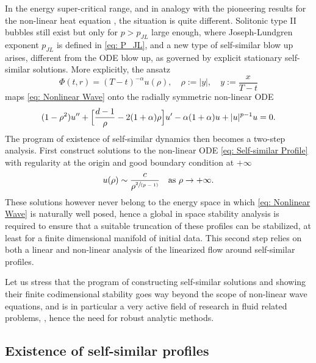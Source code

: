 \documentclass[10pt]{article}
\newcommand{\spfrac}[2]{\sfrac{#1}{(#2)}}
\theoremstyle{plain}
\theoremstyle{definition}
\begin{document}
In the energy super-critical range, and in analogy with the pioneering results for the non-linear heat equation \cite{HV, MaMe1, MaMe2,CMRcylind}, the situation is quite different. Solitonic type II bubbles still exist but only for $p>p_{JL}$ large enough, \cite{MRRnls, C} where Joseph-Lundgren exponent $p_{JL}$ is defined in \eqref{eq: P_JL}, and a new type of self-similar blow up arises, different from the ODE blow up, as governed by explicit stationary self-similar solutions. More explicitly, the ansatz
\begin{equation}
\label{eq: Ansatz}
\Phi(t,r)=(T-t)^{-\alpha}u(\rho),\quad \rho:=|y|,\quad y:=\frac{x}{T-t}
\end{equation}
maps \eqref{eq: Nonlinear Wave} onto the radially symmetric non-linear ODE
\begin{equation}
\label{eq: Self-similar Profile}
(1-\rho^2)u''+\Bigl[\frac{d-1}{\rho}-2(1+\alpha)\rho\Bigr]u'-\alpha(1+\alpha)u+|u|^{p-1}u=0.
\end{equation}
The program of existence of self-similar dynamics then becomes a two-step analysis. First construct solutions to the non-linear ODE \eqref{eq: Self-similar Profile} with regularity at the origin and good boundary condition at $+\infty$
\[
u(\rho)\sim \frac{c}{\rho^{\spfrac 2{p-1}}}\quad \mbox{as} \ \rho\to+\infty.
\]
These solutions however never belong to the energy space in which \eqref{eq: Nonlinear Wave} is naturally well posed, hence a global in space stability analysis is required to ensure that a suitable truncation of these profiles can be stabilized, at least for a finite dimensional manifold of initial data. This second step relies on both a linear and non-linear analysis of the linearized flow around self-similar profiles.

Let us stress that the program of constructing self-similar solutions and showing their finite codimensional stability goes way beyond the scope of non-linear wave equations, and is in particular a very active field of research in fluid related problems, \cite{MRRS}, hence the need for robust analytic methods.

\subsection{Existence of self-similar profiles}
\end{document}
